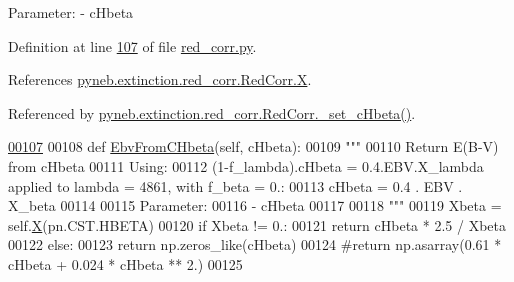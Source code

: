 \begin{DoxyVerb}
\begin{DoxyVerb}
Parameter:
    - cHbeta\end{DoxyVerb}
 

Definition at line \hyperlink{red__corr_8py_source_l00107}{107} of file \hyperlink{red__corr_8py_source}{red\-\_\-corr.\-py}.



References \hyperlink{red__corr_8py_source_l00180}{pyneb.\-extinction.\-red\-\_\-corr.\-Red\-Corr.\-X}.



Referenced by \hyperlink{red__corr_8py_source_l00164}{pyneb.\-extinction.\-red\-\_\-corr.\-Red\-Corr.\-\_\-set\-\_\-c\-Hbeta()}.


\begin{DoxyCode}
\hypertarget{classpyneb_1_1extinction_1_1red__corr_1_1_red_corr_l00107}{}\hyperlink{classpyneb_1_1extinction_1_1red__corr_1_1_red_corr_ab35df7348209fb79b956a3c8bb27e759}{00107} 
00108     \textcolor{keyword}{def }\hyperlink{classpyneb_1_1extinction_1_1red__corr_1_1_red_corr_ab35df7348209fb79b956a3c8bb27e759}{EbvFromCHbeta}(self, cHbeta):
00109         \textcolor{stringliteral}{"""}
00110 \textcolor{stringliteral}{        Return E(B-V) from cHbeta}
00111 \textcolor{stringliteral}{        Using: }
00112 \textcolor{stringliteral}{            (1-f\_lambda).cHbeta = 0.4.EBV.X\_lambda applied to lambda = 4861, with f\_beta = 0.:}
00113 \textcolor{stringliteral}{            cHbeta = 0.4 . EBV . X\_beta}
00114 \textcolor{stringliteral}{        }
00115 \textcolor{stringliteral}{        Parameter:}
00116 \textcolor{stringliteral}{            - cHbeta}
00117 \textcolor{stringliteral}{            }
00118 \textcolor{stringliteral}{        """}
00119         Xbeta = self.\hyperlink{classpyneb_1_1extinction_1_1red__corr_1_1_red_corr_aac92bb80311cda78c01e61aa44655251}{X}(pn.CST.HBETA)
00120         \textcolor{keywordflow}{if} Xbeta != 0.:
00121             \textcolor{keywordflow}{return} cHbeta * 2.5 / Xbeta
00122         \textcolor{keywordflow}{else}:
00123             \textcolor{keywordflow}{return} np.zeros\_like(cHbeta)
00124         \textcolor{comment}{#return np.asarray(0.61 * cHbeta + 0.024 * cHbeta ** 2.)}
00125     
    
\end{DoxyCode}
\hypertarget{classpyneb_1_1extinction_1_1red__corr_1_1_red_corr_a4fd27cfde692dbe6f3ff3d039bde2929}{
}
\end{DoxyVerb}
